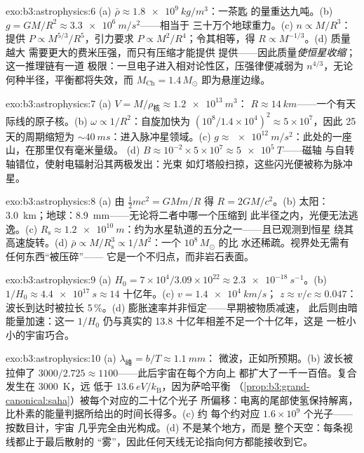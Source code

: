 \begin{solution}{exo:b3:astrophysics:6}
(a) $\bar\rho \approx \qty{1.8e9}{kg/m^3}$：一茶匙
的量重达九吨。(b) $g = GM/R^2 \approx \qty{3.3e6}{m/s^2}$——相当于
三十万个地球重力。(c) $n \propto M/R^3$：
提供 $P \propto M^{5/3}/R^5$，引力要求
$P \propto M^2/R^4$；令其相等，得 $R \propto M^{-1/3}$。(d) 质量越大
需要更大的费米压强，而只有压缩才能提供
提供——因此质量\emph{使恒星收缩}；这一推理链有一道
极限：一旦电子进入相对论性区，压强律便减弱为
$n^{4/3}$，无论何种半径，平衡都将失效，而
$M_{\text{Ch}} = 1.4\,M_\odot$ 即为悬崖边缘。
\end{solution}

\begin{solution}{exo:b3:astrophysics:7}
(a) $V = M/\rho_{\text{核}} \approx \qty{1.2e13}{m^3}$：
$R \approx \qty{14}{km}$——一个有天际线的原子核。(b)
$\omega \propto 1/R^2$：自旋加快为 $(10^8/1.4\times10^4)^2
\approx 5\times10^{7}$，因此 25 天的周期缩短为
${\sim}\qty{40}{ms}$：进入脉冲星领域。(c) $g \approx
\qty{e12}{m/s^2}$：此处的一座山，在那里仅有毫米量级。
(d) $B \approx 10^{-2}\times5\times10^{7} \approx
\qty{5e5}{T}$——磁轴
与自转轴错位，使射电辐射沿其两极发出：光束
如灯塔般扫掠，这些闪光便被称为脉冲星。
\end{solution}

\begin{solution}{exo:b3:astrophysics:8}
(a) 由 $\tfrac12mc^2 = GMm/R$ 得 $R = 2GM/c^2$。(b) 太阳：
\qty{3.0}{km}；地球：\qty{8.9}{mm}——无论将二者中哪一个压缩到
此半径之内，光便无法逃逸。(c) $R_{\text{s}} \approx
\qty{1.2e10}{m}$：约为水星轨道的五分之一——且已观测到恒星
绕其高速旋转。(d) $\bar\rho \propto
M/R_{\text{s}}^3 \propto 1/M^2$：一个 $10^8\,M_\odot$ 的比
水还稀疏。视界处无需有任何东西“被压碎”——
它是一个不归点，而非岩石表面。
\end{solution}

\begin{solution}{exo:b3:astrophysics:9}
(a) $H_0 = 7\times10^4/3.09\times10^{22} \approx
\qty{2.3e-18}{s^{-1}}$。(b) $1/H_0 \approx \qty{4.4e17}{s}
\approx 14$ 十亿年。(c) $v = \qty{1.4e4}{km/s}$；
$z \approx v/c \approx 0.047$：波长到达时被拉长
5\,\%。(d) 膨胀速率并非恒定——早期被物质减速，
此后则由暗能量加速：这一
$1/H_0$ 仍与真实的 13.8 十亿年相差不足一个十亿年，这是
一桩小小的宇宙巧合。
\end{solution}

\begin{solution}{exo:b3:astrophysics:10}
(a) $\lambda_{\text{峰}} = b/T \approx \qty{1.1}{mm}$：
微波，正如所预期。(b) 波长被拉伸了 $3000/2.725 \approx
1100$——此后宇宙在每个方向上
都扩大了一千一百倍。复合发生在 \qty{3000}{K}，远
低于 $\qty{13.6}{eV}/k_{\text{B}}$，因为萨哈平衡
（\cref{prop:b3:grand-canonical:saha}）被每个对应的二十亿个光子
所偏移：电离的尾部使氢保持解离，
比朴素的能量判据所给出的时间长得多。(c) 约
每个约对应 $1.6\times10^{9}$ 个光子——按数目计，宇宙
几乎完全由光构成。(d) 不是某个地方，而是
整个天空：每条视线都止于最后散射的
“雾”，因此任何天线无论指向何方都能接收到它。
\end{solution}

